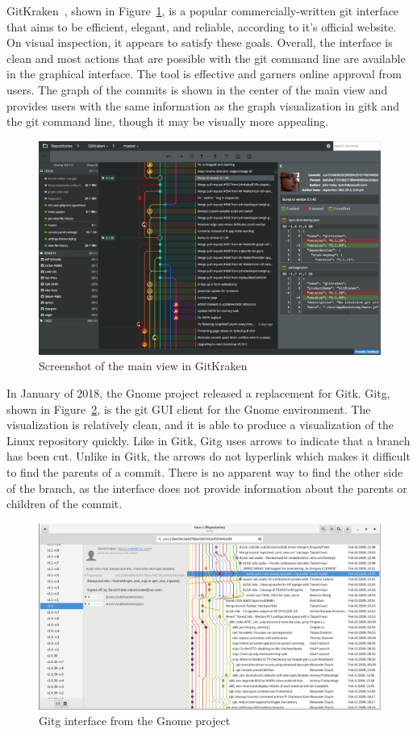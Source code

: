 GitKraken~\cite{gitkraken},
shown in Figure~\ref{fig:gitkraken_main}, is a popular
commercially-written git interface that aims to be efficient, elegant,
and reliable, according to it's official website.
On visual inspection, it appears to satisfy these goals.
Overall, the interface is clean and most actions that are possible with
the git command line are available in the graphical interface.
The tool is effective and garners online approval from users.
The graph of the commits is shown in the center of the main view and
provides users with the same information as the graph visualization in
gitk and the git command line, though it may be visually more appealing.

\begin{figure}[htpb]
  \centering
  \includegraphics[width=0.8\linewidth]{Figures/introduction/gitkraken_main.png}
  \caption{Screenshot of the main view in GitKraken\cite{gitkraken}}
  \label{fig:gitkraken_main}
\end{figure}

In January of 2018, the Gnome project released a replacement for Gitk.
Gitg\cite{gitg},
shown in Figure~\ref{fig:gitg_screenshot},
is the git GUI client for the Gnome environment.
The visualization is relatively clean, and it is able to produce a
visualization of the Linux repository quickly.
Like in Gitk, Gitg uses arrows to indicate that a branch has been cut.
Unlike in Gitk, the arrows do not hyperlink which makes it difficult to
find the parents of a commit.
There is no apparent way to find the other side of the branch,
as the interface does not provide information about the parents or
children of the commit.

\begin{figure}[htpb]
  \centering
  \includegraphics[width=0.8\linewidth]{Figures/introduction/gitg.png}
  \caption{Gitg interface from the Gnome project\cite{gitg}}
  \label{fig:gitg_screenshot}
\end{figure}

